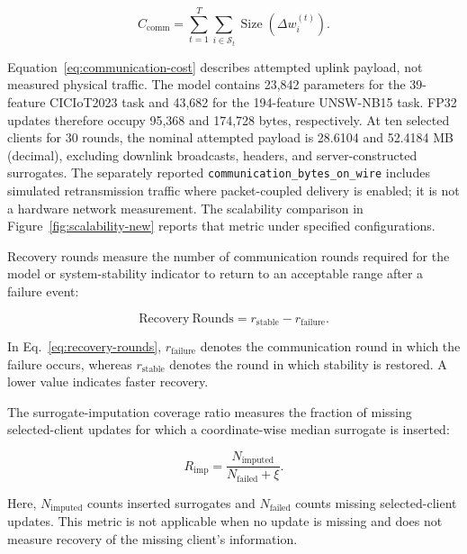 \documentclass[5p,times,numafflabel]{elsarticle}
\begin{document}
	\begin{equation}
		C_{\mathrm{comm}}
		=
		\sum_{t=1}^{T}
		\sum_{i\in\mathcal{S}_{t}}
		\operatorname{Size}
		\left(
		\Delta w_{i}^{(t)}
		\right).
		\label{eq:communication-cost}
	\end{equation}
	
	Equation~\eqref{eq:communication-cost} describes attempted uplink
	payload, not measured physical traffic. The model contains 23,842
	parameters for the 39-feature CICIoT2023 task and 43,682 for the
	194-feature UNSW-NB15 task. FP32 updates therefore occupy 95,368
	and 174,728 bytes, respectively. At ten selected clients for 30
	rounds, the nominal attempted payload is 28.6104 and 52.4184
	MB (decimal), excluding downlink broadcasts, headers, and
	server-constructed surrogates. The separately reported
	\texttt{communication\_bytes\_on\_wire} includes simulated
	retransmission traffic where packet-coupled delivery is enabled;
	it is not a hardware network measurement. The scalability
	comparison in Figure~\ref{fig:scalability-new} reports that metric
	under specified configurations.
	
	Recovery rounds measure the number of communication rounds required
	for the model or system-stability indicator to return to an acceptable
	range after a failure event:
	
	\begin{equation}
		\mathrm{Recovery\ Rounds}
		=
		r_{\mathrm{stable}}
		-
		r_{\mathrm{failure}}.
		\label{eq:recovery-rounds}
	\end{equation}
	
	In Eq.~\eqref{eq:recovery-rounds},
	\(r_{\mathrm{failure}}\) denotes the communication round in which the
	failure occurs, whereas \(r_{\mathrm{stable}}\) denotes the round in
	which stability is restored. A lower value indicates faster recovery.
	

The surrogate-imputation coverage ratio measures the fraction of
missing selected-client updates for which a coordinate-wise median
surrogate is inserted:

\begin{equation}
	R_{\mathrm{imp}}
	=
	\frac{N_{\mathrm{imputed}}}
	{N_{\mathrm{failed}}+\xi}.
	\label{eq:update-reconstruction}
\end{equation}

Here, $N_{\mathrm{imputed}}$ counts inserted surrogates and
$N_{\mathrm{failed}}$ counts missing selected-client updates.
This metric is not applicable when no update is missing and does
not measure recovery of the missing client's information.
\end{document}
